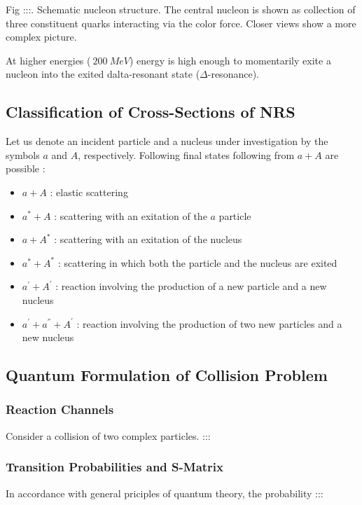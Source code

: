 Fig :::. Schematic nucleon structure. 
The central nucleon is shown as collection of three constituent quarks interacting via the color force. 
Closer views show a more complex picture.

At higher energies ($~200~MeV$) energy is high enough to momentarily exite a nucleon into the exited dalta-resonant state ($\Delta$-resonance).

\subsection{Classification of Cross-Sections of NRS}

Let us denote an incident particle and a nucleus under investigation by the symbols $a$ and $A$, respectively.
Following final states following from $a + A$ are possible \cite{iljinov94}:

\begin{itemize}
\item $a + A$ :  elastic scattering
\item $a^{*} + A$ :  scattering with an exitation of the $a$ particle
\item $a + A^{*}$ : scattering with an exitation of the nucleus
\item $a^{*} + A^{*}$ : scattering in which both the particle and the nucleus are exited
\item $a^{'} + A^{'}$ : reaction involving the production of a new particle and a new nucleus
\item $a^{'} + a^{''} + A^{'}$ : reaction involving the production of two new particles and a new nucleus
\end{itemize}

\subsection{Quantum Formulation of Collision Problem}

\subsubsection{Reaction Channels}

Consider a collision of two complex particles. ::: \cite{iljinov94}

\subsubsection{Transition Probabilities and S-Matrix}

In accordance with general priciples of quantum theory, the probability 
 ::: \cite{iljinov94}

